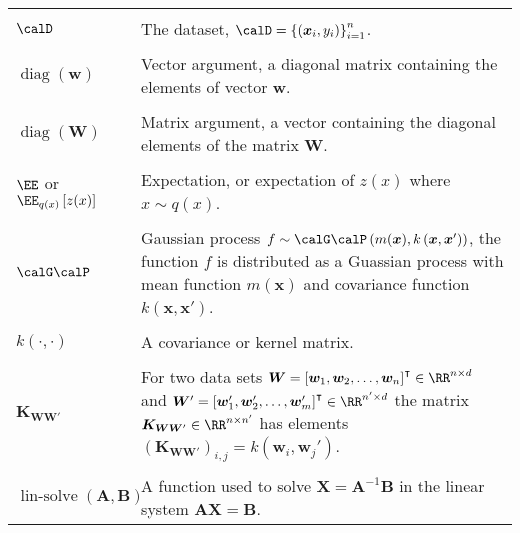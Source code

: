 \begin{longtable}{lp{}}
    \\\\
    $\calD$                                                                                                    & The dataset, $\calD = \left\{ \left( \bm{x}_i , y_{i} \right) \right\}_{i=1}^{n}$.
    \\\\
    $\operatorname{diag} \left( \bm{w} \right)$                                                                & Vector argument, a diagonal matrix containing the elements of vector $\bm{w}$.
    \\\\
    $\operatorname{diag} \left( \bm{W} \right)$                                                                & Matrix argument, a vector containing the diagonal elements of the matrix $\bm{W}$.
    \\\\
    $\EE$ or $\EE_{q(x)} \left[ z(x) \right]$                                                                  & Expectation, or expectation of $z(x)$ where $x \sim q(x)$.
    \\\\
    $\calG \calP$                                                                                              & Gaussian process $f \sim \calG \calP \left( m (\bm{x}), k \left( \bm{x}, \bm{x}' \right) \right)$, the function $f$ is distributed as a Guassian process with mean function $m \left( \bm{x} \right)$ and covariance function $k \left( \bm{x}, \bm{x}' \right)$.
    \\\\
    $k \left( \cdot , \cdot \right)$                                                                           & A covariance or kernel matrix.
    \\\\
    $\bm{K}_{\bm{W} \bm{W}'}$                                                                                  & For two data sets $\bm{W} = \left[ \bm{w}_1 ,\bm{w}_2 , \ldots , \bm{w}_n \right]^{\intercal} \in \RR^{n \times d}$ and $\bm{W}' = \left[ \bm{w}_1' ,\bm{w}_2' , \ldots , \bm{w}_m' \right]^{\intercal} \in \RR^{n' \times d}$ the matrix \( \bm{K}_{\bm{W} \bm{W}'} \in \RR^{n \times n'} \) has elements $\left( \bm{K}_{\bm{W} \bm{W}'} \right)_{i,j} = k \left( \bm{w}_i , \bm{w}_j' \right)$.
    \\\\
    $\operatorname{lin-solve} \left( \bm{A}, \bm{B} \right)$                                                   & A function used to solve $\bm{X} = \bm{A}^{-1} \bm{B}$ in the linear system $\bm{A} \bm{X} = \bm{B}$.

\end{longtable}
